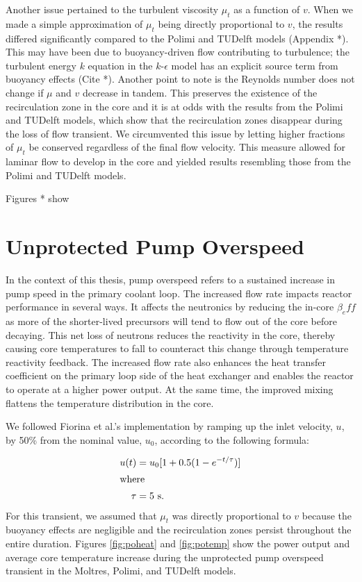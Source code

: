 Another issue pertained to the turbulent viscosity $\mu_t$ as a function of
$v$. When we made a simple approximation of $\mu_t$ being directly
proportional to $v$, the results
differed significantly compared to the Polimi and TUDelft models (Appendix *).
This may have been due to buoyancy-driven flow contributing to turbulence; the
turbulent energy $k$ equation in the $k$-$\epsilon$ model has an explicit
source term from buoyancy effects (Cite *). Another point to note is the
Reynolds number does not change if $\mu$ and $v$ decrease in tandem. This
preserves the existence of the recirculation zone in the core and it is at
odds with the results from the Polimi and TUDelft models, which show that the
recirculation zones disappear during the loss of flow transient. We
circumvented this issue by letting higher fractions of $\mu_t$ be conserved
regardless of the final flow velocity. This measure allowed for laminar flow
to develop in the core and yielded results resembling those from the Polimi
and TUDelft models.

Figures * show


\section{Unprotected Pump Overspeed}

In the context of this thesis, pump overspeed refers to a sustained
increase in pump speed in the primary coolant loop. The increased flow rate
impacts reactor performance in several ways.
It affects the neutronics by reducing the in-core $\beta_eff$ as more of the
shorter-lived precursors will tend to flow out of the core before decaying.
This net loss of neutrons reduces the reactivity in the core, thereby causing
core temperatures to fall to counteract this change through temperature
reactivity feedback. The increased flow rate also enhances the heat transfer
coefficient on the primary loop side of the heat exchanger and enables the
reactor to operate at a higher power output. At the same time, the improved
mixing flattens the temperature distribution in the core.

We followed Fiorina et al.'s implementation \cite{fiorina_modelling_2014} by
ramping up the inlet velocity, $u$, by 50\% from the nominal value, $u_0$,
according to the following formula:

\begin{align}
    u(t) &= u_0 [1 + 0.5 (1 - e^{-t / \tau})] \\
    \intertext{where}
    \tau &= 5 \text{ s.} \nonumber
\end{align}
%
For this transient, we assumed that $\mu_t$ was directly proportional to $v$
because the buoyancy effects are negligible and the recirculation zones 
persist throughout the entire duration. Figures \ref{fig:poheat} and
\ref{fig:potemp} show the power output and average core temperature increase
during the unprotected pump overspeed transient in the Moltres, Polimi, and
TUDelft models.

